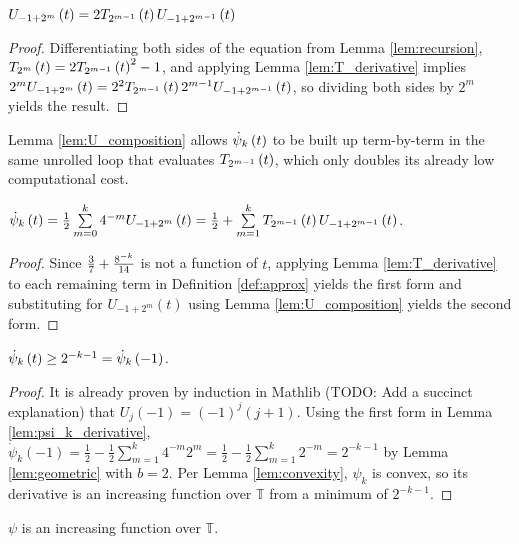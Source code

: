 \begin{lemma}
  \label{lem:U_composition}
  \leanok
  $U_{-1 + 2^m}\left(t\right) = 2 T_{2^{m - 1}}\left(t\right) U_{-1 + 2^{m - 1}}\left(t\right)$
\end{lemma}
\begin{proof}
  \leanok
  Differentiating both sides of the equation from Lemma \ref{lem:recursion}, $T_{2^{m}}\left(t\right) = 2T_{2^{m - 1}}\left(t\right)^2 - 1$, and applying Lemma \ref{lem:T_derivative} implies $2^m U_{-1 + 2^m}\left(t\right) = 2^2T_{2^{m - 1}}\left(t\right) 2^{m - 1} U_{-1 + 2^{m - 1}}\left(t\right)$, so dividing both sides by $2^m$ yields the result.
\end{proof}
Lemma \ref{lem:U_composition} allows $\dot{\psi}_{k}\left(t\right)$ to be built up term-by-term in the same unrolled loop that evaluates $T_{2^{m - 1}}\left(t\right)$, which only doubles its already low computational cost.
\begin{lemma}
  \label{lem:psi_k_derivative}
  \leanok
  $\dot{\psi}_{k}\left(t\right) = \frac{1}{2} \sum\limits_{m = 0}^k 4^{-m} U_{-1 + 2^m}\left(t\right) = \frac{1}{2} + \sum\limits_{m = 1}^k T_{2^{m - 1}}\left(t\right) U_{-1 + 2^{m - 1}}\left(t\right)$.
\end{lemma}
\begin{proof}
  \leanok
  Since $\frac{3}{7} + \frac{8^{-k}}{14}$ is not a function of $t$, applying Lemma \ref{lem:T_derivative} to each remaining term in Definition \ref{def:approx} yields the first form and substituting for $U_{-1 + 2^m}\left(t\right)$ using Lemma \ref{lem:U_composition} yields the second form.
\end{proof}

\begin{lemma}[]
  \label{lem:positive_derivative}
  \leanok
   $\dot{\psi}_{k}\left(t\right) \geq 2^{-k - 1} = \dot{\psi}_k\left(-1\right)$.
\end{lemma}

\begin{proof}
  \leanok
  It is already proven by induction in Mathlib (TODO: Add a succinct explanation) that $U_j\left(-1\right) = \left(-1\right)^j \left(j + 1\right)$. Using the first form in Lemma \ref{lem:psi_k_derivative}, $\dot{\psi}_k\left(-1\right) = \frac{1}{2} - \frac{1}{2} \sum\limits_{m = 1}^k 4^{-m} 2^m = \frac{1}{2} - \frac{1}{2} \sum\limits_{m = 1}^k 2^{-m} = 2^{-k - 1}$ by Lemma \ref{lem:geometric} with $b = 2$. Per Lemma \ref{lem:convexity}, $\psi_k$ is convex, so its derivative is an increasing function over $\mathbb{T}$ from a minimum of $2^{-k - 1}$.
\end{proof}

\begin{lemma}
  \label{lem:increasing}
  \leanok
  $\psi$ is an increasing function over $\mathbb{T}$.
\end{lemma}

